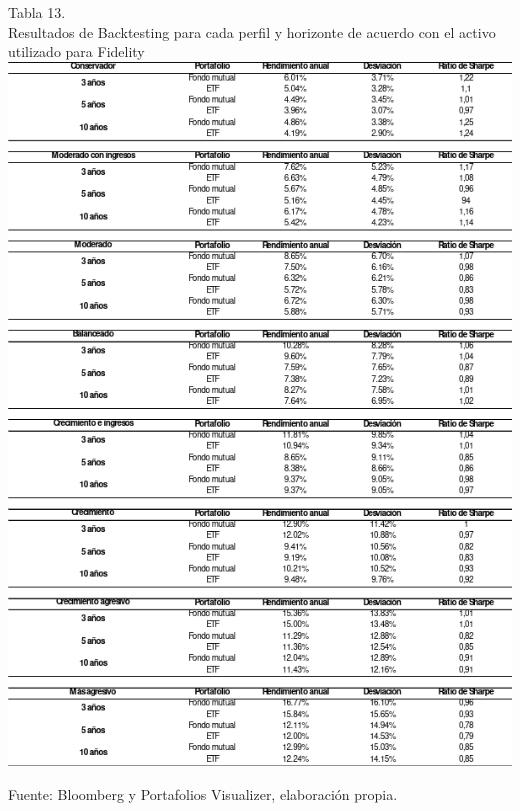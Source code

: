 \documentclass[a4paper,fleqn]{cas-sc}
\begin{document}
\begin{center}
    Tabla 13.\\
    Resultados de Backtesting para cada perfil y horizonte de acuerdo con el activo utilizado para Fidelity\\

    \includegraphics[scale=.7]{image/tabla13.png}

    \tiny Fuente: Bloomberg y Portafolios Visualizer, elaboración propia.

\end{center}
\end{document}

